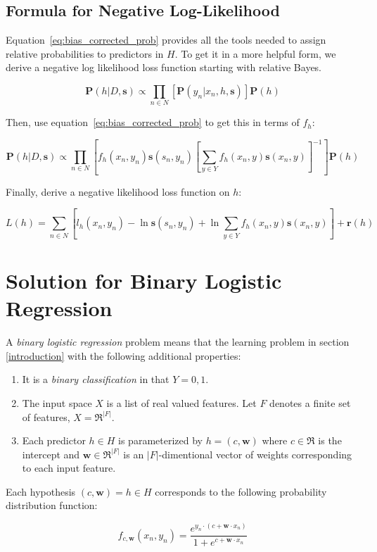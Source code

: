 \documentclass[twoside]{article}
\begin{document}
\subsection{Formula for Negative Log-Likelihood}

Equation~\eqref{eq:bias_corrected_prob} provides all the tools needed to assign relative probabilities to predictors in \(H\). To get it in a more helpful form, we derive a negative log likelihood loss function starting with relative Bayes.

\[\mathbf{P}(h|D,\mathbf{s})\propto\prod_{n \in N} \left[\mathbf{P}(y_n|x_n,h,\mathbf{s})\right]\mathbf{P}(h)\]

Then, use equation~\eqref{eq:bias_corrected_prob} to get this in terms of \(f_h\):

\[\mathbf{P}(h|D,\mathbf{s})\propto\prod_{n \in N} \left[f_h(x_n,y_n)\mathbf{s}(s_n,y_n)\left [\sum_{y \in Y}f_h(x_n,y)\mathbf{s}(x_n,y) \right ]^{-1} \right]\mathbf{P}(h)\]

Finally, derive a negative likelihood loss function on \(h\):

\[L(h)= \sum_{n \in N} \left[l_h(x_n,y_n)-\ln\mathbf{s}(s_n,y_n)+\ln\sum_{y \in Y}f_h(x_n,y)\mathbf{s}(x_n,y) \right] +\mathbf{r}(h)\]

\section{Solution for Binary Logistic Regression}
\label{section:logistic}

A \textit{binary logistic regression} problem means that the learning problem in section \ref{introduction} with the following additional properties:
\begin{enumerate}
	\item It is a \textit{binary classification} in that \(Y = {0, 1}\).
	\item The input space \(X\) is a list of real valued features. Let \(F\) denotes a finite set of features, \(X = \Re ^{|F|}\).
	\item Each predictor \(h \in H\) is parameterized by \(h = (c, \mathbf{w})\) where \(c \in \Re\) is the intercept and \(\mathbf{w} \in \Re ^{|F|}\) is an \(|F|\)-dimentional vector of weights corresponding to each input feature.
\end{enumerate}

Each hypothesis \((c, \mathbf{w})=h \in H\) corresponds to the following probability distribution function:

\[f_{c,\mathbf{w}}(x_n, y_n)=\frac{e^{y_n \cdot (c+\mathbf{w} \cdot x_n)}}{1+e^{c+\mathbf{w} \cdot x_n}}\]
\end{document}
